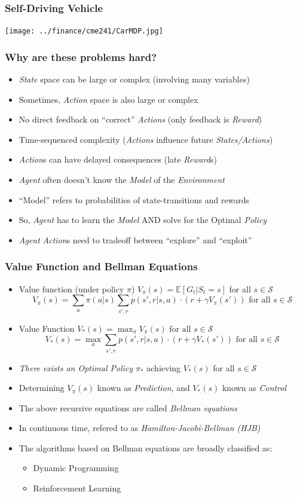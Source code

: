 \documentclass[handout]{beamer}
\begin{document}
\begin{frame}
\frametitle{Self-Driving Vehicle}
\texttt{[image: ../finance/cme241/CarMDP.jpg]}
\end{frame}

\begin{frame}
\frametitle{Why are these problems hard?}
\pause
\begin{itemize}[<+->]
\item {\em State} space can be large or complex (involving many variables)
\item Sometimes, {\em Action} space is also large or complex
\item No direct feedback on ``correct'' {\em Actions} (only feedback is {\em Reward})
\item Time-sequenced complexity ({\em Actions} influence future {\em States/Actions})
\item {\em Action}s can have delayed consequences (late {\em Reward}s)
\item {\em Agent} often doesn't know the {\em Model} of the {\em Environment}
\item ``Model'' refers to probabilities of state-transitions and rewards
\item So, {\em Agent} has to learn the {\em Model} AND solve for the Optimal {\em Policy}
\item {\em Agent} {\em Action}s need to tradeoff between ``explore'' and ``exploit''
\end{itemize}
\end{frame}

\begin{frame}
\frametitle{Value Function and Bellman Equations}
\pause
\begin{itemize}
\item Value function (under policy $\pi$) $V_{\pi}(s) = \mathbb{E}[G_t|S_t = s]$ for all $s \in \mathcal{S}$
\pause
$$V_{\pi}(s) = \sum_{a} \pi(a|s) \sum_{s',r} p(s',r|s,a) \cdot (r + \gamma V_{\pi}(s')) \mbox{ for all } s \in \mathcal{S}$$
\pause
\item  Value Function $V_{*}(s) = \max_{\pi} V_{\pi}(s) \mbox{ for all } s \in \mathcal{S}$
\pause
$$V_{*}(s) = \max_{a} \sum_{s',r} p(s',r|s,a) \cdot (r + \gamma V_{*}(s')) \mbox{ for all } s \in \mathcal{S}$$
\pause
\item {\em There exists an Optimal Policy} $\pi_{*}$ achieving $V_{*}(s)$ for all $s \in \mathcal{S}$
\pause
\item Determining $V_{\pi}(s)$ known as {\em Prediction}, and $V_{*}(s)$ known as {\em Control}
\pause
\item The above recursive equations are called {\em Bellman equations}
\pause
\item In continuous time, refered to as {\em Hamilton-Jacobi-Bellman (HJB)}
\pause
\item The algorithms based on Bellman equations are broadly classified as:
\begin{itemize}
\item Dynamic Programming
\item Reinforcement Learning
\end{itemize}

\end{itemize}
\end{frame}
\end{document}
